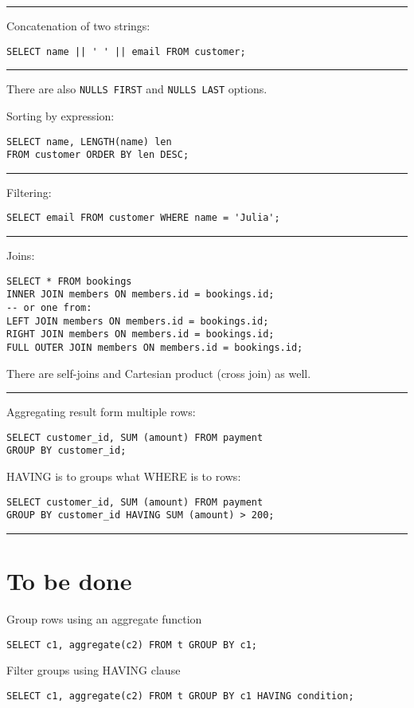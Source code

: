 \documentclass{charun}
\begin{document}
\begin{multicols*}{2}
\hrule

Concatenation of two strings:
\begin{verbatim}
SELECT name || ' ' || email FROM customer;
\end{verbatim}

\hrule

There are also \texttt{NULLS FIRST} and \texttt{NULLS LAST} options.

Sorting by expression:
\begin{verbatim}
SELECT name, LENGTH(name) len
FROM customer ORDER BY len DESC;
\end{verbatim}

\hrule

Filtering:
\begin{verbatim}
SELECT email FROM customer WHERE name = 'Julia';
\end{verbatim}

\hrule

Joins:
\begin{verbatim}
SELECT * FROM bookings
INNER JOIN members ON members.id = bookings.id;
-- or one from:
LEFT JOIN members ON members.id = bookings.id;
RIGHT JOIN members ON members.id = bookings.id;
FULL OUTER JOIN members ON members.id = bookings.id;
\end{verbatim}

There are self-joins and Cartesian product (cross join) as well.

\hrule

Aggregating result form multiple rows:
\begin{verbatim}
SELECT customer_id, SUM (amount) FROM payment
GROUP BY customer_id;
\end{verbatim}

HAVING is to groups what WHERE is to rows:
\begin{verbatim}
SELECT customer_id, SUM (amount) FROM payment
GROUP BY customer_id HAVING SUM (amount) > 200;
\end{verbatim}

\hrule

\section{To be done}

Group rows using an aggregate function
\begin{verbatim}
SELECT c1, aggregate(c2) FROM t GROUP BY c1;
\end{verbatim}

Filter groups using HAVING clause
\begin{verbatim}
SELECT c1, aggregate(c2) FROM t GROUP BY c1 HAVING condition;
\end{verbatim}
    

\end{multicols*}
\end{document}
